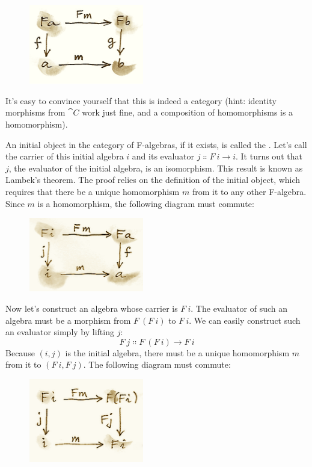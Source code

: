 \begin{figure}[H]
\centering
\includegraphics[width=50mm]{images/alg.png}
\end{figure}

\noindent
It's easy to convince yourself that this is indeed a category (hint:
identity morphisms from $\cat{C}$ work just fine, and a composition of
homomorphisms is a homomorphism).

An initial object in the category of F-algebras, if it exists, is called
the . Let's call the carrier of this initial
algebra $i$ and its evaluator $j \Colon F\ i \to i$. It turns out that $j$,
the evaluator of the initial algebra, is an isomorphism. This result is
known as Lambek's theorem. The proof relies on the definition of the
initial object, which requires that there be a unique homomorphism
$m$ from it to any other F-algebra. Since $m$ is a
homomorphism, the following diagram must commute:

\begin{figure}[H]
\centering
\includegraphics[width=50mm]{images/alg2.png}
\end{figure}

\noindent
Now let's construct an algebra whose carrier is $F\ i$. The
evaluator of such an algebra must be a morphism from $F\ (F\ i)$
to $F\ i$. We can easily construct such an evaluator simply by
lifting $j$:
\[F\ j \Colon F\ (F\ i) \to F\ i\]
Because $(i, j)$ is the initial algebra, there must be a unique
homomorphism $m$ from it to $(F\ i, F\ j)$. The following
diagram must commute:

\begin{figure}[H]
\centering
\includegraphics[width=50mm]{images/alg3a.png}
\end{figure}


